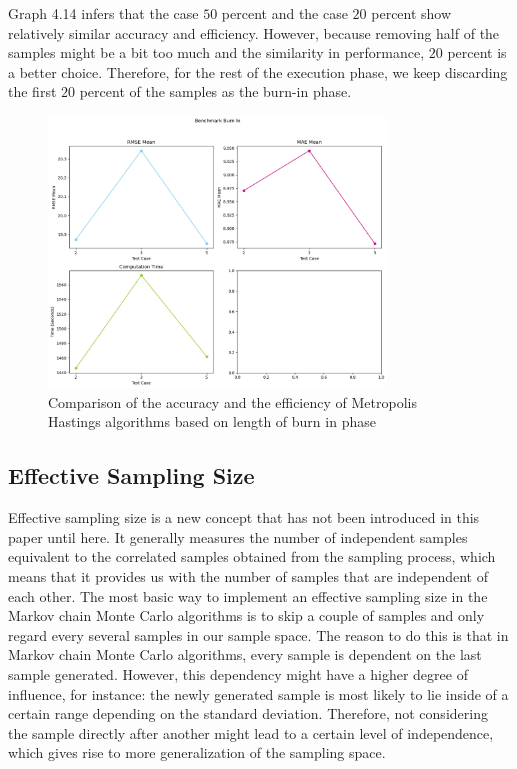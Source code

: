 Graph 4.14 infers that the case $50$ percent and the case $20$ percent show relatively similar accuracy and efficiency. However, because removing half of the samples might be a bit too much and the similarity in performance, $20$ percent is a better choice. Therefore, for the rest of the execution phase, we keep discarding the first $20$ percent of the samples as the burn-in phase.

\begin{figure}
    \centering
    \includegraphics[width=0.8\textwidth]{figures/basic_mh/benchmark/burnin_factor.png}
    \captionsetup{width=.8\textwidth}
    \caption{Comparison of the accuracy and the efficiency of Metropolis Hastings algorithms based on length of burn in phase}
    \label{fig:enter-label}
\end{figure}

\subsection{Effective Sampling Size}
Effective sampling size is a new concept that has not been introduced in this paper until here. It generally measures the number of independent samples equivalent to the correlated samples obtained from the sampling process, which means that it provides us with the number of samples that are independent of each other.\cite{effective_samples_size} The most basic way to implement an effective sampling size in the Markov chain Monte Carlo algorithms is to skip a couple of samples and only regard every several samples in our sample space. The reason to do this is that in Markov chain Monte Carlo algorithms, every sample is dependent on the last sample generated. However, this dependency might have a higher degree of influence, for instance: the newly generated sample is most likely to lie inside of a certain range depending on the standard deviation. Therefore, not considering the sample directly after another might lead to a certain level of independence, which gives rise to more generalization of the sampling space. 


